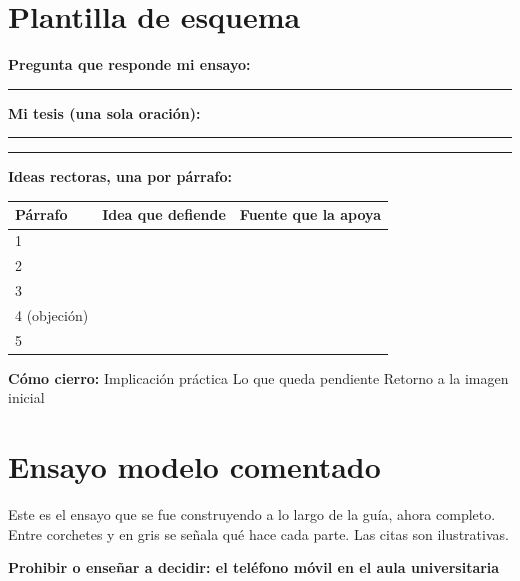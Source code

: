 \documentclass[12pt,a4paper,openany]{report}
\begin{document}
\chapter{Plantilla de esquema}
\label{anx:esquema}

\textbf{Pregunta que responde mi ensayo:} \rule{9.2cm}{0.4pt}

\vspace{10pt}
\textbf{Mi tesis (una sola oraci\'on):}

\vspace{4pt}
\rule{\textwidth}{0.4pt}

\vspace{6pt}
\rule{\textwidth}{0.4pt}

\vspace{12pt}
\textbf{Ideas rectoras, una por p\'arrafo:}

\begin{table}[htbp]
	\centering
	\small
	\begin{tabular}{C{1.6cm} L{7.4cm} L{4.4cm}}
		\toprule
		\textbf{P\'arrafo} & \textbf{Idea que defiende} & \textbf{Fuente que la apoya} \\
		 & & \\
		2 & & \\
		3 & & \\
		4 (objeci\'on) & & \\
		5 & & \\
		\bottomrule
	\end{tabular}
\end{table}

\textbf{C\'omo cierro:} \fbox{\phantom{x}} Implicaci\'on pr\'actica \quad \fbox{\phantom{x}} Lo que queda pendiente \quad \fbox{\phantom{x}} Retorno a la imagen inicial

\chapter{Ensayo modelo comentado}
\label{anx:modelo}

Este es el ensayo que se fue construyendo a lo largo de la gu\'ia, ahora completo. Entre corchetes y en gris se se\~nala qu\'e hace cada parte. Las citas son ilustrativas.

\vspace{10pt}
\begin{center}
	{\sffamily\large\bfseries Prohibir o ense\~nar a decidir: el tel\'efono m\'ovil en el aula universitaria}
\end{center}
\end{document}
